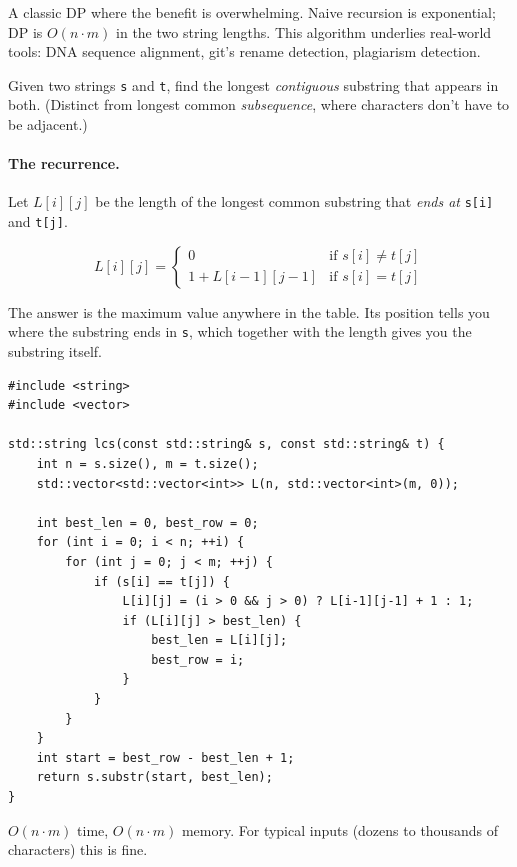 \documentclass[11pt]{article}
\begin{document}
A classic DP where the benefit is overwhelming. Naive recursion is
exponential; DP is $O(n \cdot m)$ in the two string lengths. This
algorithm underlies real-world tools: DNA sequence alignment, git's
rename detection, plagiarism detection.

\begin{defnbox}
Given two strings \texttt{s} and \texttt{t}, find the longest
\emph{contiguous} substring that appears in both. (Distinct from
longest common \emph{subsequence}, where characters don't have to be
adjacent.)
\end{defnbox}

\paragraph{The recurrence.} Let $L[i][j]$ be the length of the
longest common substring that \emph{ends at} \texttt{s[i]} and
\texttt{t[j]}.

\[
L[i][j] = \begin{cases}
0 & \text{if } s[i] \ne t[j] \\
1 + L[i-1][j-1] & \text{if } s[i] = t[j]
\end{cases}
\]

The answer is the maximum value anywhere in the table. Its position
tells you where the substring ends in \texttt{s}, which together with
the length gives you the substring itself.

\begin{examplebox}
\begin{verbatim}
#include <string>
#include <vector>

std::string lcs(const std::string& s, const std::string& t) {
    int n = s.size(), m = t.size();
    std::vector<std::vector<int>> L(n, std::vector<int>(m, 0));

    int best_len = 0, best_row = 0;
    for (int i = 0; i < n; ++i) {
        for (int j = 0; j < m; ++j) {
            if (s[i] == t[j]) {
                L[i][j] = (i > 0 && j > 0) ? L[i-1][j-1] + 1 : 1;
                if (L[i][j] > best_len) {
                    best_len = L[i][j];
                    best_row = i;
                }
            }
        }
    }
    int start = best_row - best_len + 1;
    return s.substr(start, best_len);
}
\end{verbatim}
$O(n \cdot m)$ time, $O(n \cdot m)$ memory. For typical inputs
(dozens to thousands of characters) this is fine.
\end{examplebox}
\end{document}
